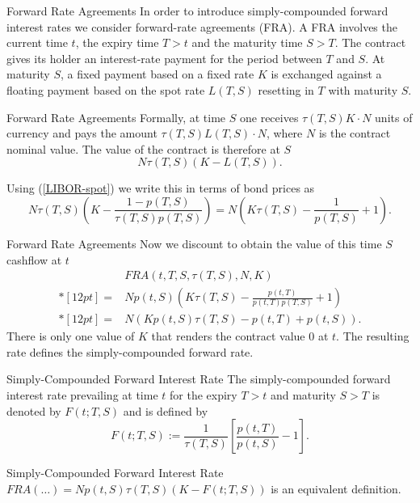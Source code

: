 Forward Rate Agreements
	In order to introduce simply-compounded forward interest rates we
	consider forward-rate agreements (FRA). A FRA involves the current
	time $t$, the expiry time $T>t$ and the maturity time $S>T$. The
	contract gives its holder an interest-rate payment for the period
	between $T$ and $S$. At maturity $S$, a fixed payment based on a
	fixed rate $K$ is exchanged against a floating payment based on
	the spot rate $L(T,S)$ resetting in $T$ with maturity $S$.


Forward Rate Agreements
	Formally, at time $S$ one receives $\tau(T,S)K\cdot N$ units of
	currency and pays the amount $\tau(T,S)L(T,S)\cdot N$, where $N$
	is the contract nominal value. The value of the contract is
	therefore at $S$
		\begin{equation}\label{FRA-1}
		N\tau(T,S)(K-L(T,S)).
		\end{equation}
	
	Using (\ref{LIBOR-spot}) we write this in terms of bond prices as
		$$
		N\tau(T,S)\left(K-\frac{1-p(T,S)}{\tau(T,S)p(T,S)}\right)=N\left(K\tau(T,S)-\frac{1}{p(T,S)}+1\right).
		$$


Forward Rate Agreements
	Now we discount to obtain the value of this time $S$ cashflow at $t$
		$$
		\begin{array}{ll}
		& FRA(t,T,S,\tau(T,S),N,K) \\*[12pt] = & Np(t,S)\left(K\tau(T,S)-\frac{p(t,T)}{p(t,T)p(T,S)}+1\right) \\*[12pt]
			= &N(K p(t,S)\tau(T,S)-p(t,T)+p(t,S)).
		\end{array}
		$$
	There is only one value of $K$ that renders the contract value $0$
	at $t$. The resulting rate defines the simply-compounded forward rate.


Simply-Compounded Forward Interest Rate
	The simply-compounded forward interest rate prevailing at time $t$
	for the expiry $T>t$ and maturity $S>T$ is denoted by $F(t;T,S)$
	and is defined by
		\begin{equation}
		F(t;T,S):=\frac{1}{\tau(T,S)} \left[\frac{p(t,T)}{p(t,S)}-1\right].
		\end{equation}


Simply-Compounded Forward Interest Rate
	$FRA(\ldots)=Np(t,S)\tau(T,S)(K-F(t; T,S))$ is an equivalent definition.
	
